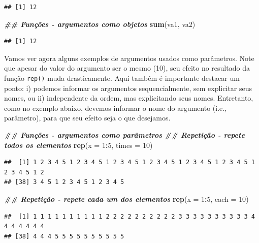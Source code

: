 \documentclass[
]{article}
\newenvironment{Shaded}{\begin{snugshade}}{\end{snugshade}}
\newcommand{\AttributeTok}[1]{\textcolor[rgb]{0.13,0.29,0.53}{#1}}
\newcommand{\DecValTok}[1]{\textcolor[rgb]{0.00,0.00,0.81}{#1}}
\newcommand{\DocumentationTok}[1]{\textcolor[rgb]{0.56,0.35,0.01}{\textbf{\textit{#1}}}}
\newcommand{\FunctionTok}[1]{\textcolor[rgb]{0.13,0.29,0.53}{\textbf{#1}}}
\newcommand{\NormalTok}[1]{#1}
\newcommand{\SpecialCharTok}[1]{\textcolor[rgb]{0.81,0.36,0.00}{\textbf{#1}}}
\begin{document}
\begin{verbatim}
## [1] 12
\end{verbatim}

\begin{Shaded}
\begin{Highlighting}[]
\DocumentationTok{\#\# Funções {-} argumentos como objetos}
\FunctionTok{sum}\NormalTok{(va1, va2)}
\end{Highlighting}
\end{Shaded}

\begin{verbatim}
## [1] 12
\end{verbatim}

Vamos ver agora alguns exemplos de argumentos usados como parâmetros. Note que apesar do valor do argumento ser o mesmo (10), seu efeito no resultado da função \texttt{rep()} muda drasticamente. Aqui também é importante destacar um ponto: i) podemos informar os argumentos sequencialmente, sem explicitar seus nomes, ou ii) independente da ordem, mas explicitando seus nomes. Entretanto, como no exemplo abaixo, devemos informar o nome do argumento (i.e., parâmetro), para que seu efeito seja o que desejamos.

\begin{Shaded}
\begin{Highlighting}[]
\DocumentationTok{\#\# Funções {-} argumentos como parâmetros}
\DocumentationTok{\#\# Repetição {-} repete todos os elementos}
\FunctionTok{rep}\NormalTok{(}\AttributeTok{x =} \DecValTok{1}\SpecialCharTok{:}\DecValTok{5}\NormalTok{, }\AttributeTok{times =} \DecValTok{10}\NormalTok{)}
\end{Highlighting}
\end{Shaded}

\begin{verbatim}
##  [1] 1 2 3 4 5 1 2 3 4 5 1 2 3 4 5 1 2 3 4 5 1 2 3 4 5 1 2 3 4 5 1 2 3 4 5 1 2
## [38] 3 4 5 1 2 3 4 5 1 2 3 4 5
\end{verbatim}

\begin{Shaded}
\begin{Highlighting}[]
\DocumentationTok{\#\# Repetição {-} repete cada um dos elementos}
\FunctionTok{rep}\NormalTok{(}\AttributeTok{x =} \DecValTok{1}\SpecialCharTok{:}\DecValTok{5}\NormalTok{, }\AttributeTok{each =} \DecValTok{10}\NormalTok{)}
\end{Highlighting}
\end{Shaded}

\begin{verbatim}
##  [1] 1 1 1 1 1 1 1 1 1 1 2 2 2 2 2 2 2 2 2 2 3 3 3 3 3 3 3 3 3 3 4 4 4 4 4 4 4
## [38] 4 4 4 5 5 5 5 5 5 5 5 5 5
\end{verbatim}
\end{document}
